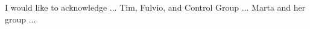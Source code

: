 
\begin{acknowledgements}

I would like to acknowledge ... Tim, Fulvio, and Control Group ... Marta and her group ...

\end{acknowledgements}
